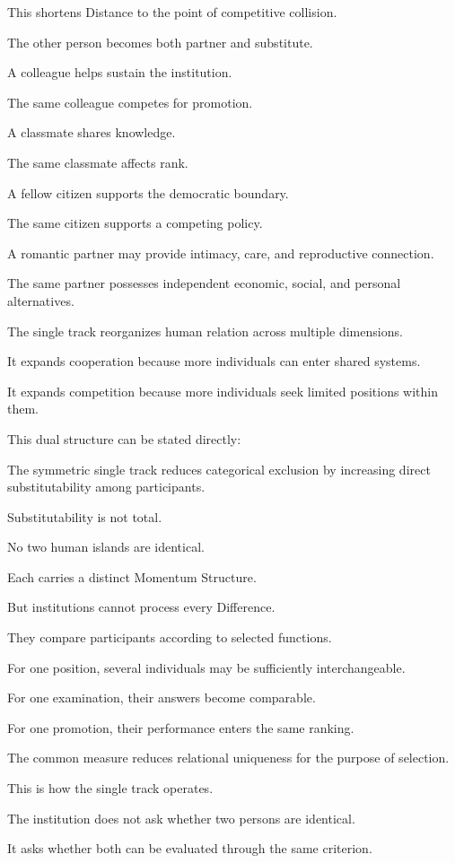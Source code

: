 This shortens Distance to the point of competitive collision.

The other person becomes both partner and substitute.

A colleague helps sustain the institution.

The same colleague competes for promotion.

A classmate shares knowledge.

The same classmate affects rank.

A fellow citizen supports the democratic boundary.

The same citizen supports a competing policy.

A romantic partner may provide intimacy, care, and reproductive connection.

The same partner possesses independent economic, social, and personal alternatives.

The single track reorganizes human relation across multiple dimensions.

It expands cooperation because more individuals can enter shared systems.

It expands competition because more individuals seek limited positions within them.

This dual structure can be stated directly:

The symmetric single track reduces categorical exclusion by increasing direct substitutability among participants.

Substitutability is not total.

No two human islands are identical.

Each carries a distinct Momentum Structure.

But institutions cannot process every Difference.

They compare participants according to selected functions.

For one position, several individuals may be sufficiently interchangeable.

For one examination, their answers become comparable.

For one promotion, their performance enters the same ranking.

The common measure reduces relational uniqueness for the purpose of selection.

This is how the single track operates.

The institution does not ask whether two persons are identical.

It asks whether both can be evaluated through the same criterion.

